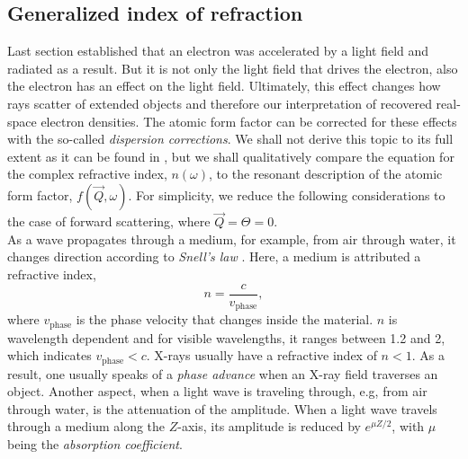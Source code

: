 \subsection{Generalized index of refraction}\label{sec:generalized-index-of-refraction}
Last section established that an electron was accelerated by a light field and radiated as a result.
But it is not only the light field that drives the electron, also the electron has an effect on the light field. Ultimately, this effect changes how rays scatter of extended objects and therefore our interpretation of recovered real-space electron densities. The atomic form factor can be corrected for these effects with the so-called \textit{dispersion corrections}. We shall not derive this topic to its full extent as it can be found in \citep[][p. 55 ff]{Attwood-2007-CUP}, but we shall qualitatively compare the equation for the complex refractive index, $n\left(\omega\right)$, to the resonant description of the atomic form factor, $f\left(\vec{Q},\omega\right)$. For simplicity, we reduce the following considerations to the case of forward scattering, where $\vec{Q}=\Theta=0$.\\[1\baselineskip]
%
As a wave propagates through a medium, for example, from air through water, it changes direction according to \textit{Snell's law} \citep{Als-Nielson-2011-JWS}. Here, a medium is attributed a refractive index,
\begin{equation}
n=\frac{c}{v_{\text{phase}}},
\label{eq:refractive-index}
\end{equation}
where $v_{\text{phase}}$ is the phase velocity that changes inside the material. $n$ is wavelength dependent and for visible wavelengths, it ranges between 1.2 and 2, which indicates $v_{\text{phase}}<c$. X-rays usually have a refractive index of $n<1$. As a result, one usually speaks of a \textit{phase advance} when an X-ray field traverses an object.
Another aspect, when a light wave is traveling through, e.g, from air through water, is the attenuation of the amplitude. When a light wave travels through a medium along the $Z$-axis, its amplitude is reduced by $e^{\mu Z/2}$, with $\mu$ being the \textit{absorption coefficient}.
